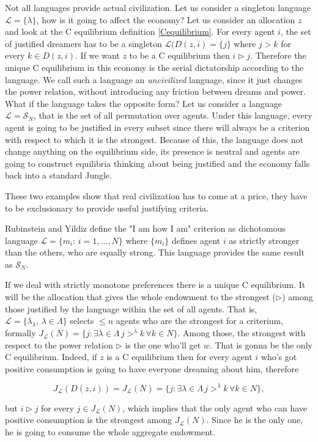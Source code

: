 \begin{example}
    Not all languages provide actual civilization. Let us consider a singleton language $\mathcal{L}=\{\lambda\}$, how is it going to affect the economy? Let us consider an allocation $z$ and look at the C equilibrium definition \ref{Cequilibrium}. For every agent $i$, the set of justified dreamers has to be a singleton ${\mathcal{L}}(D(z,i)=\{j\}$ where $j>k$ for every $k\in D(z,i)$. If we want $z$ to be a C equilibrium then $i\triangleright j$. Therefore the unique C equilibrium in this economy is the serial dictatorship according to the language. We call such a language an \textit{uncivilized} language, since it just changes the power relation, without introducing any friction between dreams and power. What if the language takes the opposite form? Let us consider a language $\mathcal{L}=\mathcal{S}_N$, that is the set of all permutation over agents.  Under this language, every agent is going to be justified in every subset since there will always be a criterion with respect to which it is the strongest. Because of this, the language does not change anything on the equilibrium side, its presence is neutral and agents are going to construct equilibria thinking about being justified and the economy falls back into a standard Jungle.

    These two examples show that real civilization has to come at a price, they have to be exclusionary to provide useful justifying criteria.
\end{example}

Rubinstein and Yildiz define the "I am how I am" criterion as dichotomous language $\mathcal{L}=\{m_i:\,i=1,\dots,N\}$ where $\{m_i\}$ defines agent $i$ as strictly stronger than the others, who are equally strong. This language provides the same result as $\mathcal{S}_N$. 

\begin{example}
    If we deal with strictly monotone preferences there is a unique C equilibrium. It will be the allocation that gives the whole endowment to the strongest ($\triangleright$) among those justified by the language within the set of all agents. That is, $\mathcal{L}=\{\lambda_{\lambda},\,\lambda\in\Lambda\}$ selects $\leq n$ agents who are the strongest for a criterium, formally $J_{\mathcal{L}}(N)=\{j:\exists \lambda\in\Lambda\,j>^{\lambda}k\,\forall k\in N\}$. Among those, the strongest with respect to the power relation $\triangleright$ is the one who'll get $w$. That is gonna be the only C equilibrium. Indeed, if $z$ is a C equilibrium then for every agent $i$ who's got positive consumption is going to have everyone dreaming about him, therefore
    
    \[J_{\mathcal{L}}(D(z,i))=J_{\mathcal{L}}(N)=\{j:\exists \lambda\in\Lambda\,j>^{\lambda}k\,\forall k\in N\},\]

    but $i\triangleright j$ for every $j\in J_{\mathcal{L}}(N)$, which implies that the only agent who can have positive consumption is the strongest among $J_{\mathcal{L}}(N)$. Since he is the only one, he is going to consume the whole aggregate endowment.
\end{example}

